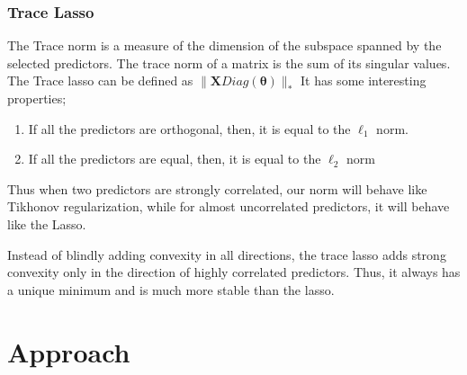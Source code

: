 \documentclass[11pt]{article}
\begin{document}
\subsubsection{Trace Lasso}

The Trace norm is a measure of the dimension of the subspace spanned by the selected predictors.
The trace norm of a matrix is the sum of its singular values. 
The Trace lasso can be defined as $\| \mathbf{X} Diag(\mathbf{\theta})\|_*$
It has some interesting properties;
\begin{enumerate}
\item  If all the predictors are orthogonal, then, it is equal to the $\ell_1$ norm.
\item  If all the predictors are equal, then, it is equal to the $\ell_2$ norm
\end{enumerate}

Thus when two predictors are strongly correlated, our norm will behave like
Tikhonov regularization, while for almost uncorrelated predictors, it will behave like the Lasso.

Instead of blindly adding convexity in all directions, the trace lasso adds strong convexity only in the direction of highly correlated predictors. 
Thus, it always has a unique minimum and is much more stable than the lasso. 
\section{Approach}
\end{document}
